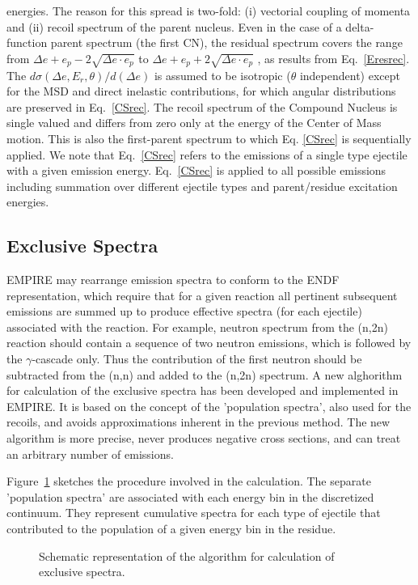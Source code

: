 \documentclass[twocolumn,amsmath,amssymb,10pt,groupedaddress,a4paper]{revtex4}
\begin{document}
energies. The reason for this spread is two-fold: (i) vectorial coupling
of momenta and (ii) recoil spectrum of the parent nucleus. Even in
the case of a delta-function parent spectrum (the first CN), the residual
spectrum covers the range from $\Delta e+e_{p}-2\sqrt{\Delta e\cdot e_{p}}$
to $\Delta e+e_{p}+2\sqrt{\Delta e\cdot e_{p}}$ , as results from
Eq.~\ref{Eresrec}. The $d\sigma(\Delta e,E_{r},\theta)/d(\Delta e)$
is assumed to be isotropic ($\theta$ independent) except for the
MSD and direct inelastic contributions, for which angular
distributions are preserved in Eq.~\ref{CSrec}. The recoil spectrum
of the Compound Nucleus is single valued and differs from zero only
at the energy of the Center of Mass motion. This is also the first-parent
spectrum to which Eq. \ref{CSrec} is sequentially applied. We note
that Eq.~\ref{CSrec} refers to the emissions of a single type ejectile
with a given emission energy. Eq.~\ref{CSrec} is  applied to all
possible emissions including summation over different ejectile types
and parent/residue excitation energies.

\subsection{Exclusive Spectra}
EMPIRE may rearrange emission spectra to conform to the ENDF representation,
which require that for a given reaction all pertinent subsequent emissions
are summed up to produce effective spectra (for each ejectile) associated
with the reaction. For example, neutron spectrum from the (n,2n) reaction
should contain a sequence of two neutron emissions, which is followed
by the $\gamma$-cascade only. Thus the contribution of the first
neutron should be subtracted from the (n,n) and added to the (n,2n)
spectrum.
A new alghorithm for calculation of the exclusive spectra has been
developed and implemented in EMPIRE. It is based on the concept
of the 'population spectra', also used for the recoils, and avoids
approximations inherent in the previous method. The new algorithm
is more precise, never produces negative cross sections, and can treat
an arbitrary number of emissions.

Figure~\ref{exclusive} sketches the procedure involved in the calculation.
The separate 'population spectra' are associated with each energy bin in the
discretized continuum. They represent cumulative spectra for each type of ejectile
that contributed to the population of a given energy bin in the residue.
\begin{figure}[htbp]
\caption{\label{exclusive} Schematic representation  of the algorithm for calculation
of exclusive spectra.}
\end{figure}
\end{document}
